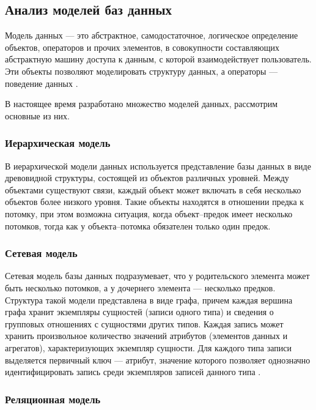 \subsection{Анализ моделей баз данных}

Модель данных --- это абстрактное, самодостаточное, логическое определение объектов, операторов и прочих элементов, в совокупности составляющих абстрактную машину доступа к данным, с которой взаимодействует пользователь. Эти объекты позволяют моделировать структуру данных, а операторы — поведение данных \cite{modeldb}. 

В настоящее время разработано множество моделей данных, рассмотрим основные из них.

\subsubsection{Иерархическая модель}

В иерархической модели данных используется представление базы данных в виде древовидной структуры, состоящей из объектов различных уровней. Между объектами существуют связи, каждый объект может включать в себя несколько объектов более низкого уровня. Такие объекты находятся в отношении предка к потомку, при этом возможна ситуация, когда объект--предок имеет несколько потомков, тогда как у объекта--потомка обязателен только один предок.

\subsubsection{Сетевая модель}

Сетевая модель базы данных подразумевает, что у родительского элемента может быть несколько потомков, а у дочернего элемента --- несколько предков. Структура такой модели представлена в виде графа, причем каждая вершина графа хранит экземпляры сущностей (записи одного типа) и сведения о групповых отношениях с сущностями других типов. Каждая запись может хранить произвольное количество значений атрибутов (элементов данных и агрегатов), характеризующих экземпляр сущности. Для каждого типа записи выделяется первичный ключ --- атрибут, значение которого позволяет однозначно идентифицировать запись среди экземпляров записей данного типа \cite{setmodel}.

\subsubsection{Реляционная модель}


